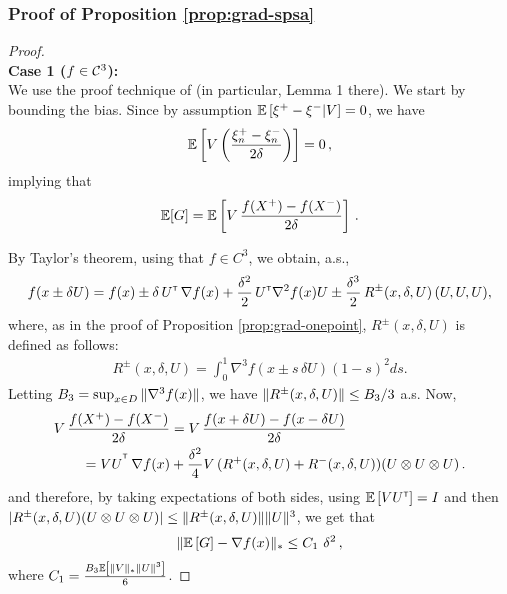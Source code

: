 \subsubsection*{Proof of Proposition \ref{prop:grad-spsa}}
\begin{proof}\ \\
\textbf{Case 1 ($f \in \mathcal{C}^3$):}\ \\
We use the proof technique of \cite{spall1992multivariate}
  (in particular, Lemma 1 there).
We start by bounding the bias.
Since by assumption $\mathbb{E}\left[ \xi^+-\xi^-|V\right]=0$, we have
\begin{align*}
\mathbb{E}\left[  V\left(\dfrac{\xi_n^+ - \xi_n^-}{2\delta}\right) \right]= 0\,,
\end{align*}
implying that
\begin{align*}
\mathbb{E}[G] =  \mathbb{E}\left[V\,  \dfrac{f(X^+)  -f(X^-)}{2\delta} \right]\,.
\end{align*}

By Taylor's theorem, using that $f\in C^3$, we obtain, a.s.,
\begin{align*}
f(x \pm \delta U) =
 f(x)
 \pm\delta\,  U^\mathsf{\scriptscriptstyle T}\,\nabla f(x)
  + \frac{\delta^2}{2}\, U^\mathsf{\scriptscriptstyle T} \nabla^2 f(x) U
  \pm  \frac{\delta^3}{2} \, R^{\pm}(x,\delta,U) \,(U, U, U),
\end{align*}
where, as in the proof of Proposition \ref{prop:grad-onepoint}, $R^{\pm}(x,\delta,U)$ is defined as follows:
\begin{align}
 R^{\pm}(x,\delta,U)= \int_0^1  \nabla^3 f(  x \pm s \, \delta U ) (1-s)^2 ds. \label{eq:taylor-r}
\end{align}
Letting $B_3 = \sup_{x\in D} \| \nabla^3 f(x) \|$,%
we have $\| R^{\pm}(x,\delta,U)\| \le B_3/3$ a.s.
Now,
\begin{align}
\begin{split}
\MoveEqLeft       V\, \dfrac{f(X^+)-f(X^-)}{2\delta}
  = V\, \dfrac{f(x+\delta U) - f(x-\delta U)}{2\delta} \\
&= VU^{\tr}
\, \nabla f(x)   +   \frac{\delta^2}{4}  V \,(R^{+}(x,\delta,U)+R^{-}(x,\delta,U))(U \otimes U \otimes U)\,.
\end{split}
\label{eq:l1}
\end{align}
and therefore,
by taking expectations of both sides,
using $\mathbb{E}\left[V U^\mathsf{\scriptscriptstyle T}\right] = I$ and then $|R^{\pm}(x,\delta,U) (U \otimes U \otimes U)| \le
\|R^{\pm}(x,\delta,U)\| \|U\|^3$,
we get that
\begin{align*}
\| \mathbb{E}\left[ G \right] - \nabla f(x) \|_*
\le C_1\,\, \delta^2 \,,
\end{align*}
where $C_1 = \frac{B_3 \mathbb{E}\left[ \|V\|_* \|U\|^3 \right]}{6}$.


\end{proof}
